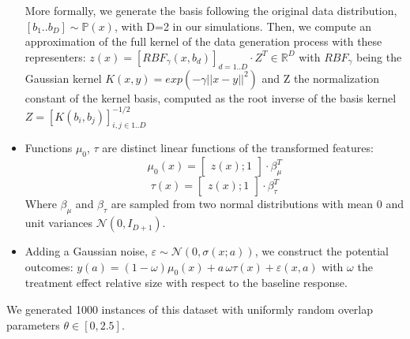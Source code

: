 \documentclass[a4paper,num-refs]{oup-contemporary}%
\begin{document}
\begin{itemize}
          More formally, we generate the basis following the original data
          distribution, $\left [ b_1 .. b_D \right ] \sim \mathbb P(x)$,
          with D=2 in our simulations. Then, we compute an approximation
          of the full kernel of the data generation process with these
          representers: $z(x) = [RBF_{\gamma}(x, b_d)]_{d=1..D} \cdot
              Z^T \in \mathbb{R}^D$ with $RBF_{\gamma}$ being the Gaussian
          kernel $K(x, y) = exp(-\gamma ||x-y||^2)$ and Z the
          normalization constant of the kernel basis, computed as the
          root inverse of the basis kernel $Z=[K(b_i, b_j)]_{i, j \in
              {1..D}}^{-1/2}$


    \item Functions $\mu_0$, $\tau$ are distinct linear functions of the
          transformed features:
          \begin{equation*}
              \mu_0(x) = \begin{bmatrix} z(x); 1 \end{bmatrix} \cdot \beta_{\mu}^T
          \end{equation*}
          \begin{equation*}
              \tau(x) = \begin{bmatrix} z(x); 1 \end{bmatrix} \cdot \beta_{\tau}^T
          \end{equation*}
          Where $\beta_{\mu}$ and $\beta_{\tau}$ are sampled from two normal distributions with mean 0 and unit variances $\mathcal{N}(0, I_{D+1})$.
    \item Adding a Gaussian noise, $\varepsilon \sim \mathcal N(0, \sigma(x;a))$,
          we construct the potential outcomes:
          $y(a) = (1-\omega)\mu_0(x) + a\,\omega\tau(x) + \varepsilon(x, a)$ with $\omega$ the treatment effect relative size with respect to the baseline response.
\end{itemize}
We generated 1000 instances of this dataset with uniformly random overlap
parameters $\theta \in \left[ 0, 2.5 \right]$.
\end{document}
